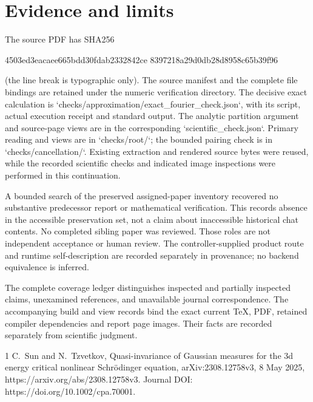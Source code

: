 \documentclass[10pt]{article}
\begin{document}
\section*{Evidence and limits}
The source PDF has SHA256\par
4503ed3eacaee665bdd30fdab2332842ce
8397218a29d0db28d8958c65b39f96\par
(the line break is typographic only). The source manifest and the complete file bindings are retained under the numeric verification directory. The decisive exact calculation is `checks/approximation/exact\_fourier\_check.json`, with its script, actual execution receipt and standard output. The analytic partition argument and source-page views are in the corresponding `scientific\_check.json`. Primary reading and views are in `checks/root/`; the bounded pairing check is in `checks/cancellation/`. Existing extraction and rendered source bytes were reused, while the recorded scientific checks and indicated image inspections were performed in this continuation.\par
A bounded search of the preserved assigned-paper inventory recovered no substantive predecessor report or mathematical verification. This records absence in the accessible preservation set, not a claim about inaccessible historical chat contents. No completed sibling paper was reviewed. Those roles are not independent acceptance or human review. The controller-supplied product route and runtime self-description are recorded separately in provenance; no backend equivalence is inferred.\par
The complete coverage ledger distinguishes inspected and partially inspected claims, unexamined references, and unavailable journal correspondence. The accompanying build and view records bind the exact current TeX, PDF, retained compiler dependencies and report page images. Their facts are recorded separately from scientific judgment.\par
1 C. Sun and N. Tzvetkov, Quasi-invariance of Gaussian measures for the 3d energy critical nonlinear Schrödinger equation, arXiv:2308.12758v3, 8 May 2025, https://arxiv.org/abs/2308.12758v3. Journal DOI: https://doi.org/10.1002/cpa.70001.\par
\end{document}
